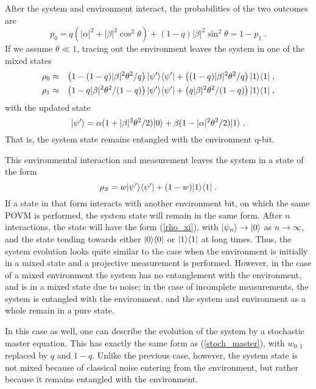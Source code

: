 After the system and environment interact, the probabilities of the
two outcomes are
\begin{equation}
p_0 = q (|\alpha|^2 + |\beta|^2 \cos^2\theta)
  + (1-q) |\beta|^2 \sin^2\theta = 1 - p_1 \;.
\end{equation}
If we assume $\theta\ll1$, tracing out the environment leaves the
system in one of the mixed states
\begin{eqnarray}
\rho_0 &\approx&
  \left( 1 - (1-q)|\beta|^2\theta^2/q \right) {| \psi' \rangle}{\langle \psi' |}
  + \left( (1-q)|\beta|^2\theta^2/q \right) {| 1 \rangle}{\langle 1 |} \;, \nonumber\\
\rho_1 &\approx&
  \left( 1 - q|\beta|^2\theta^2/(1-q) \right) {| \psi' \rangle}{\langle \psi' |}
  + \left( q|\beta|^2\theta^2/(1-q) \right) {| 1 \rangle}{\langle 1 |} \;,
\end{eqnarray}
with the updated state
\begin{equation}
{| \psi' \rangle} = \alpha(1+|\beta|^2\theta^2/2){| 0 \rangle}
  + \beta(1-|\alpha|^2\theta^2/2){| 1 \rangle} \;.
\end{equation}
That is, the system state remains entangled with the environment q-bit.

This environmental interaction and measurement leaves the system in
a state of the form
\begin{equation}
\rho_S = w {| \psi' \rangle}{\langle \psi' |} + (1-w) {| 1 \rangle}{\langle 1 |} \;.
\end{equation}
If a state in that form interacts with another environment bit, on which
the same POVM is performed, the system state will remain in the same form.
After $n$ interactions, the state will have the form (\ref{rho_xi}),
with ${| \psi_n \rangle}\rightarrow{| 0 \rangle}$ as $n\rightarrow\infty$, and the
state tending towards either ${| 0 \rangle}{\langle 0 |}$ or ${| 1 \rangle}{\langle 1 |}$ at long times.
Thus, the system evolution looks quite similar to the case when the
environment is initially in a mixed state and a projective measurement
is performed.  However, in the case of a mixed environment the system
has no entanglement with the environment, and is in a mixed state due to
noise; in the case of incomplete measurements, the system is entangled
with the environment, and the system and environment as a whole remain
in a pure state.

In this case as well, one can describe the evolution of the system by
a stochastic master equation.  This has exactly the same form as
(\ref{stoch_master}), with $w_{0,1}$ replaced by $q$ and $1-q$.  Unlike
the previous case, however, the system state is not mixed because of
classical noise entering from the environment, but rather because it
remains entangled with the environment.

